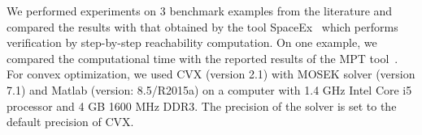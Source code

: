 We performed experiments on $3$ benchmark examples from the literature
and compared the results with that obtained by the tool
SpaceEx~\cite{FLD+11} which performs verification by step-by-step reachability computation. On one example, we compared the computational
time with the reported results of the MPT
tool~\cite{rakovic2004computation}.  For convex optimization, we used
CVX (version 2.1) with MOSEK solver (version 7.1) and Matlab (version:
8.5/R2015a) on a computer with 1.4 GHz Intel Core i5 processor and 4 GB
1600 MHz DDR3.  The precision of the solver is set to the default
precision of CVX.

\begin{table}

\end{table}
